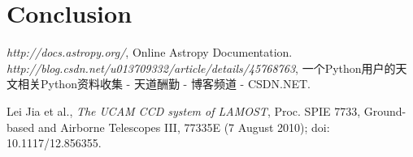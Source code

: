 \documentclass[12pt,twoside,letterpaper]{article}
\begin{document}
\section{Conclusion} 


   \begin{thebibliography}{99}



      \emph{http://docs.astropy.org/}, Online Astropy Documentation.
      \emph{http://blog.csdn.net/u013709332/article/details/45768763}, 一个Python用户的天文相关Python资料收集 - 天道酬勤 - 博客频道 - CSDN.NET.

      Lei Jia et al., \emph{The UCAM CCD system of LAMOST}, Proc. SPIE 7733, Ground-based and Airborne Telescopes III, 77335E (7 August 2010); doi: 10.1117/12.856355.


   \end{thebibliography}
\end{document}
